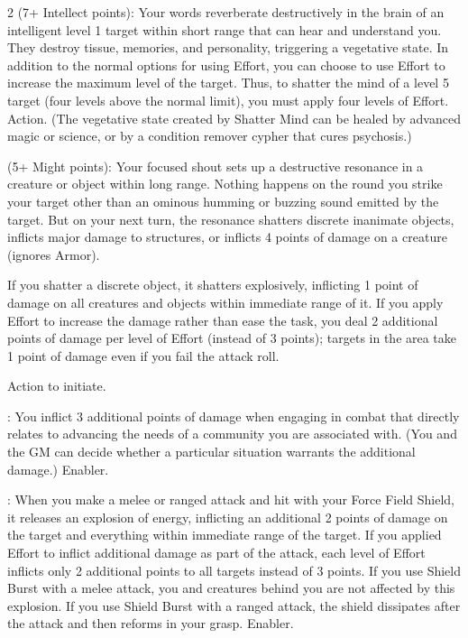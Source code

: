 \begin{multicols}{2}
 (7+ Intellect points): Your words reverberate destructively in the brain of an intelligent level 1 target within short range that can hear and understand you. They destroy tissue, memories, and personality, triggering a vegetative state. In addition to the normal options for using Effort, you can choose to use Effort to increase the maximum level of the target. Thus, to shatter the mind of a level 5 target (four levels above the normal limit), you must apply four levels of Effort. Action. (The vegetative state created by Shatter Mind can be healed by advanced magic or science, or by a condition remover cypher that cures psychosis.)
 
 (5+ Might points): Your focused shout sets up a destructive resonance in a creature or object within long range. Nothing happens on the round you strike your target other than an ominous humming or buzzing sound emitted by the target. But on your next turn, the resonance shatters discrete inanimate objects, inflicts major damage to structures, or inflicts 4 points of damage on a creature (ignores Armor). 

If you shatter a discrete object, it shatters explosively, inflicting 1 point of damage on all creatures and objects within immediate range of it. If you apply Effort to increase the damage rather than ease the task, you deal 2 additional points of damage per level of Effort (instead of 3 points); targets in the area take 1 point of damage even if you fail the attack roll. 

Action to initiate. 
 
: You inflict 3 additional points of damage when engaging in combat that directly relates to advancing the needs of a community you are associated with. (You and the GM can decide whether a particular situation warrants the additional damage.) Enabler. 
 
: When you make a melee or ranged attack and hit with your Force Field Shield, it releases an explosion of energy, inflicting an additional 2 points of damage on the target and everything within immediate range of the target. If you applied Effort to inflict additional damage as part of the attack, each level of Effort inflicts only 2 additional points to all targets instead of 3 points. If you use Shield Burst with a melee attack, you and creatures behind you are not affected by this explosion. If you use Shield Burst with a ranged attack, the shield dissipates after the attack and then reforms in your grasp. Enabler. 
 

\end{multicols}
